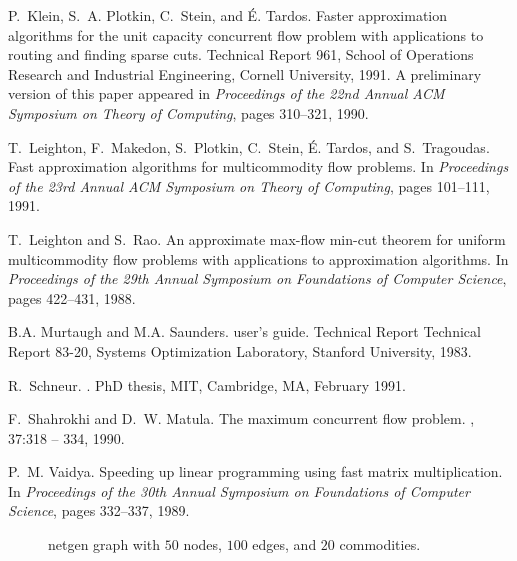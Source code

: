 \begin{thebibliography}{10}
P.~Klein, S.~A. Plotkin, C.~Stein, and \'{E}. Tardos.
\newblock Faster approximation algorithms for the unit capacity concurrent flow
  problem with applications to routing and finding sparse cuts.
\newblock Technical Report 961, School of Operations Research and Industrial
  Engineering, Cornell University, 1991.
\newblock A preliminary version of this paper appeared in {\em Proceedings of
  the 22nd Annual {ACM} Symposium on Theory of Computing}, pages 310--321,
  1990.

T.~Leighton, F.~Makedon, S.~Plotkin, C.~Stein, \'E. Tardos, and S.~Tragoudas.
\newblock Fast approximation algorithms for multicommodity flow problems.
\newblock In {\em Proceedings of the 23rd Annual {ACM} Symposium on Theory of
  Computing}, pages 101--111, 1991.

T.~Leighton and S.~Rao.
\newblock An approximate max-flow min-cut theorem for uniform multicommodity
  flow problems with applications to approximation algorithms.
\newblock In {\em Proceedings of the 29th Annual Symposium on Foundations of
  Computer Science}, pages 422--431, 1988.

B.A. Murtaugh and M.A. Saunders.
 user's guide.
\newblock Technical Report Technical Report 83-20, Systems Optimization
  Laboratory, Stanford University, 1983.

R.~Schneur.
.
\newblock PhD thesis, MIT, Cambridge, MA, February 1991.

F.~Shahrokhi and D.~W. Matula.
\newblock The maximum concurrent flow problem.
, 37:318 -- 334, 1990.

P.~M. Vaidya.
\newblock Speeding up linear programming using fast matrix multiplication.
\newblock In {\em Proceedings of the 30th Annual Symposium on Foundations of
  Computer Science}, pages 332--337, 1989.

\end{thebibliography}


\begin{figure}
\begin{center}
\mbox{}
\end{center}
\figinfo
\caption{{\sc netgen} graph with
$50$ nodes, $100$ edges, and $20$ commodities. }
\label{fig:p1}
\end{figure}

